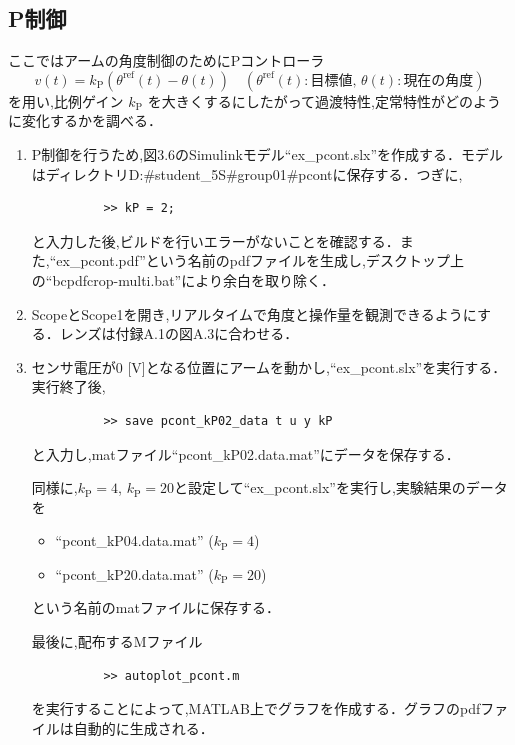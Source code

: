 \subsection{P制御}

ここではアームの角度制御のためにPコントローラ
\begin{equation}
  v(t) = k_{\mathrm{P}} \left( \theta^{\text{ref}}(t) - \theta(t) \right) \quad \left( \theta^{\text{ref}}(t) : \text{目標値} , \, \theta(t) : \text{現在の角度} \right)
\end{equation}
を用い,比例ゲイン $k_{\mathrm{P}}$ を大きくするにしたがって過渡特性,定常特性がどのように変化するかを調べる．


\begin{enumerate}
  \item P制御を行うため,図3.6のSimulinkモデル“ex\_pcont.slx”を作成する．モデルはディレクトリD:\#student\_5S\#group01\#pcontに保存する．つぎに,
        \begin{verbatim}
          >> kP = 2;
        \end{verbatim}
        と入力した後,ビルドを行いエラーがないことを確認する．また,“ex\_pcont.pdf”という名前のpdfファイルを生成し,デスクトップ上の“bcpdfcrop-multi.bat”により余白を取り除く．
        
  \item ScopeとScope1を開き,リアルタイムで角度と操作量を観測できるようにする．レンズは付録A.1の図A.3に合わせる．
        
  \item センサ電圧が0 [V]となる位置にアームを動かし,“ex\_pcont.slx”を実行する．実行終了後,
        \begin{verbatim}
          >> save pcont_kP02_data t u y kP
        \end{verbatim}
        と入力し,matファイル“pcont\_kP02.data.mat”にデータを保存する．
        
        同様に,$k_{\mathrm{P}} = 4$, $k_{\mathrm{P}} = 20$と設定して“ex\_pcont.slx”を実行し,実験結果のデータを
        \begin{itemize}
          \item “pcont\_kP04.data.mat” ($k_{\mathrm{P}} = 4$)
          \item “pcont\_kP20.data.mat” ($k_{\mathrm{P}} = 20$)
        \end{itemize}
        という名前のmatファイルに保存する．
        
        最後に,配布するMファイル
        \begin{verbatim}
          >> autoplot_pcont.m
        \end{verbatim}
        を実行することによって,MATLAB上でグラフを作成する．グラフのpdfファイルは自動的に生成される．
\end{enumerate}

